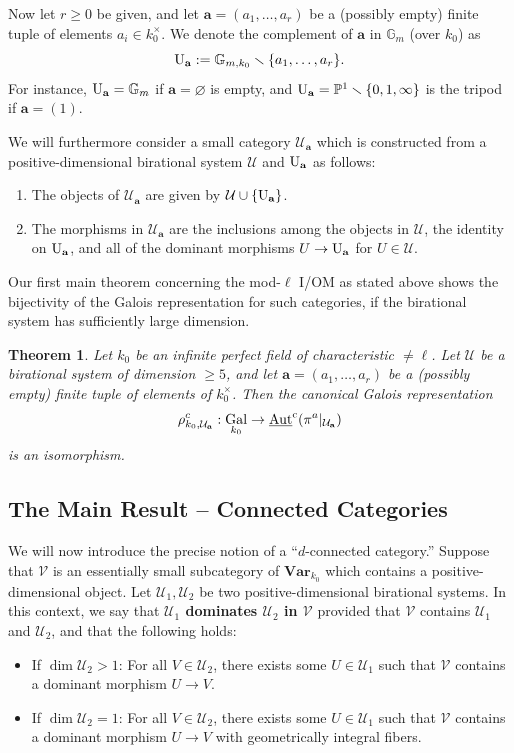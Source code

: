 \documentclass[11pt]{amsart}
\newtheorem{maintheorem}{Theorem}
\theoremstyle{definition}
\theoremstyle{remark}
\numberwithin{equation}{section}
\DeclareMathOperator{\Aut}{Aut}
\DeclareMathOperator{\Gal}{Gal}
\newcommand{\U}{{\rm U}}
\newcommand{\Gbb}{\mathbb{G}}
\newcommand{\Pbb}{\mathbb{P}}
\newcommand{\Vc}{\mathcal{V}}
\newcommand{\Ucal}{\mathcal{U}}
\newcommand{\abf}{\mathbf{a}}
\newcommand{\UAutc}{\underline{\Aut}^{\rm c}}
\newcommand{\Var}{\mathbf{Var}}
\newcommand{\Galk}{{\Gal_{k_0}}}
\begin{document}
Now let $r \geq 0$ be given, and let $\abf = (a_1,\ldots,a_r)$ be a (possibly empty) finite tuple of elements $a_i \in k_0^\times$.
We denote the complement of $\abf$ in $\Gbb_m$ (over $k_0$) as
\[ \U_\abf := \Gbb_{m,k_0} \smallsetminus \{a_1,\ldots,a_r\}. \]
For instance, $\U_\abf = \Gbb_m$ if $\abf = \varnothing$ is empty, and $\U_\abf = \Pbb^1 \smallsetminus \{0,1,\infty\}$ is the tripod if $\abf = (1)$.

We will furthermore consider a small category $\Ucal_\abf$ which is constructed from a positive-dimensional birational system $\Ucal$ and $\U_\abf$ as follows:
\begin{enumerate}
  \item The objects of $\Ucal_\abf$ are given by $\Ucal \cup \{\U_\abf\}$.
  \item The morphisms in $\Ucal_\abf$ are the inclusions among the objects in $\Ucal$, the identity on $\U_\abf$, and all of the dominant morphisms $U \rightarrow \U_\abf$ for $U \in \Ucal$.
\end{enumerate}
Our first main theorem concerning the mod-$\ell$ I/OM as stated above shows the bijectivity of the Galois representation for such categories, if the birational system has sufficiently large dimension.

\begin{maintheorem}
\label{maintheorem: intro / main-result / iom-main-opens}
  Let $k_0$ be an infinite perfect field of characteristic $\neq \ell$.
  Let $\Ucal$ be a birational system of dimension $\geq 5$, and let $\abf = (a_1,\ldots,a_r)$ be a (possibly empty) finite tuple of elements of $k_0^\times$.
  Then the canonical Galois representation 
  \[ \rho^c_{k_0,\Ucal_\abf} : \Galk \rightarrow \UAutc(\pi^a|_{\Ucal_\abf}) \]
  is an isomorphism.
\end{maintheorem}

\subsection{The Main Result -- Connected Categories}
\label{subsection: intro / main-result-connected}

We will now introduce the precise notion of a ``$d$-connected category.''
Suppose that $\Vc$ is an essentially small subcategory of $\Var_{k_0}$ which contains a positive-dimensional object.
Let $\Ucal_1,\Ucal_2$ be two positive-dimensional birational systems.
In this context, we say that {\bf $\Ucal_1$ dominates $\Ucal_2$ in $\Vc$} provided that $\Vc$ contains $\Ucal_1$ and $\Ucal_2$, and that the following holds:
\begin{itemize}
  \item If $\dim \Ucal_2 > 1$: For all $V \in \Ucal_2$, there exists some $U \in \Ucal_1$ such that $\Vc$ contains a dominant morphism $U \rightarrow V$.
  \item If $\dim \Ucal_2 = 1$: For all $V \in \Ucal_2$, there exists some $U \in \Ucal_1$ such that $\Vc$ contains a dominant morphism $U \rightarrow V$ with geometrically integral fibers.
\end{itemize}
\end{document}
